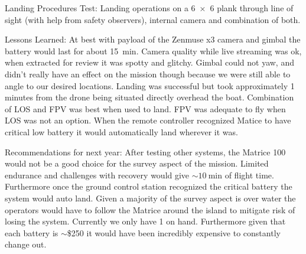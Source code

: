 Landing Procedures Test: Landing operations on a \SI{6x6}{\foot} plank through line of sight (with help from safety observers), internal camera and combination of both.

Lessons Learned: At best with payload of the Zenmuse x3 camera and gimbal the battery would last for about \SI{15}{\minute}. Camera quality while live streaming was ok, when extracted for review it was spotty and glitchy. Gimbal could not yaw, and didn't really have an effect on the mission though because we were still able to angle to our desired locations. Landing was successful but took approximately 1 minutes from the drone being situated directly overhead the boat. Combination of LOS and FPV was best when used to land. FPV was adequate to fly when LOS was not an option. When the remote controller recognized Matice to have critical low battery it would automatically land wherever it was.
 
Recommendations for next year: After testing other systems, the Matrice 100 would not be a good choice for the survey aspect of the mission. Limited endurance and challenges with recovery would give $\sim\SI{10}{\minute}$ of flight time. Furthermore once the ground control station recognized the critical battery the system would auto land. Given a majority of the survey aspect is over water the operators would have to follow the Matrice around the island to mitigate risk of losing the system. Currently we only have 1 on hand. Furthermore given that each battery is $\sim$\$250 it would have been incredibly expensive to constantly change out.

